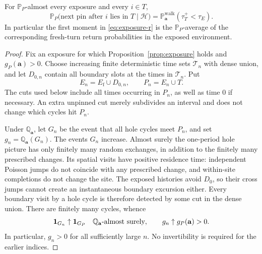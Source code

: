 \begin{lemma}
\label{lem:exposure-dense-return}
For \(\mathbb P_P\)-almost every exposure and every \(i\in T\),
\begin{equation}
 \mathbb P_P\bigl(\text{next pin after }i\text{ lies in }T
                              \mid\mathcal H\bigr)
   =\mathbb P_{\mathbf a}^{\mathrm{walk}}
                         (\tau_T^+<\tau_E).
 \label{eq:fresh-return-identity}
\end{equation}
In particular the first moment in \eqref{eq:exposure-r} is the
\(\mathbb P_P\)-average of the corresponding fresh-turn return
probabilities in the exposed environment.
\end{lemma}

\begin{proof}
Fix an exposure for which Proposition~\ref{prop:exposure} holds and
\(g_P(\mathbf a)>0\).  Choose increasing finite deterministic time
sets \(\mathcal T_n\) with dense union, and let \(D_{0,n}\) contain
all boundary slots at the times in \(\mathcal T_n\).  Put
\[
 E_n=E_{\mathrm f}\cup D_{0,n},\qquad P_n=E_n\cup T.
\]
The cuts used below include all times occurring in \(P_n\), as well
as time \(0\) if necessary.  An extra unpinned cut merely subdivides
an interval and does not change which cycles hit \(P_n\).

Under \(\mathbb Q_{\mathbf a}\), let \(G_n\) be the event that
all hole cycles meet \(P_n\), and set
\(g_n=\mathbb Q_{\mathbf a}(G_n)\).  The events \(G_n\) increase.
Almost surely the one-period hole picture has only finitely many
random exchanges, in addition to the finitely many prescribed changes.
Its spatial visits have positive residence time: independent Poisson
jumps do not coincide with any prescribed change, and within-site
completions do not change the site.  The exposed histories avoid
\(D_0\), so their cross jumps cannot create an instantaneous
boundary excursion either.  Every boundary visit by a hole cycle is
therefore detected by some cut in the dense union.  There are finitely
many cycles, whence
\begin{equation}
 \mathbf 1_{G_n}\uparrow\mathbf 1_{G_P}\quad
       \mathbb Q_{\mathbf a}\text{-almost surely},\qquad
 g_n\uparrow g_P(\mathbf a)>0.
 \label{eq:dense-all-hit-limit}
\end{equation}
In particular, \(g_n>0\) for all sufficiently large \(n\).
No invertibility is required for the earlier indices.


\end{proof}
